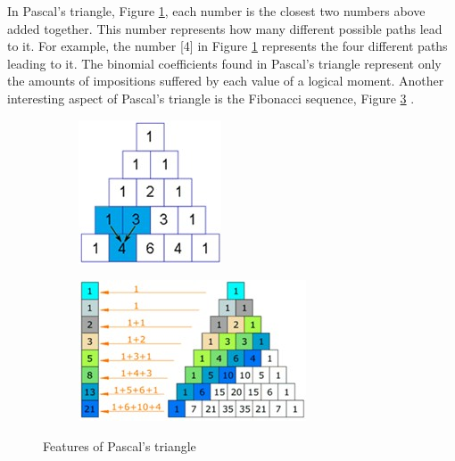 In Pascal's triangle, Figure \ref{fig:pascal_triangle}, each number is the closest two numbers above added together. This number represents how many different possible paths lead to it. For example, the number [4] in Figure \ref{fig:pascal_triangle} represents the four different paths leading to it. The binomial coefficients found in Pascal's triangle represent only the amounts of impositions suffered by each value of a logical moment. Another interesting aspect of Pascal's triangle is the Fibonacci sequence, Figure \ref{fig:pascal_triangle_fibonacci} \cite{mathisfun_pascal_triangle}.
\enlargethispage{\baselineskip}
	\begin{figure}[H]
	\centering
		\begin{subfigure}[H]{0.47\linewidth}
		\centering
		\includegraphics[width=.55\linewidth]{sections/images/pascal_triangle.jpg}
		\caption{}
		\label{fig:pascal_triangle}
		\end{subfigure}
	\hfill
		\begin{subfigure}[H]{0.47\linewidth}
		\centering
		\includegraphics[width=.9\linewidth]{sections/images/pascal_triangle_fibonacci.jpg}
		\caption{}
		\label{fig:pascal_triangle_fibonacci}
		\end{subfigure}%
	\caption{Features of Pascal's triangle}
	\end{figure}
